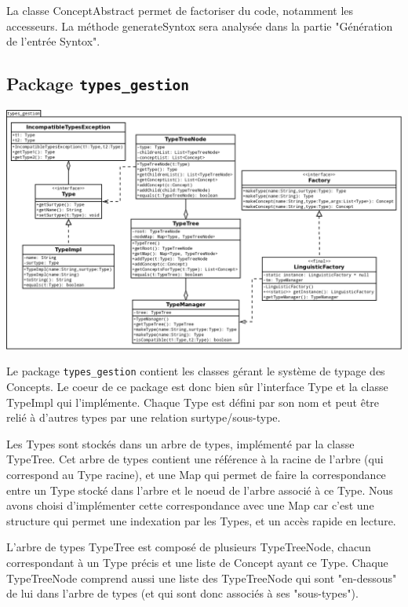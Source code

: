 \documentclass[12pt]{report}
\begin{document}
La classe ConceptAbstract permet de factoriser du code, notamment les accesseurs.
La méthode generateSyntox sera analysée dans la partie "Génération de l'entrée Syntox".

\subsection{Package \texttt{types\_gestion}}

\begin{center}
\includegraphics[scale=0.4]{DiagLinguistic_types_gestion.png}
\end{center}

Le package \texttt{types\_gestion} contient les classes gérant le système de typage des Concepts. Le coeur de ce package est donc bien sûr l'interface Type et la classe TypeImpl qui l'implémente.
Chaque Type est défini par son nom et peut être relié à d'autres types par une relation surtype/sous-type.

\bigskip

Les Types sont stockés dans un arbre de types, implémenté par la classe TypeTree. Cet arbre de types contient une référence à la racine de l'arbre (qui correspond au Type racine), et une Map qui permet de faire la correspondance entre un Type stocké dans l'arbre et le noeud de l'arbre associé à ce Type. Nous avons choisi d'implémenter cette correspondance avec une Map car c'est une structure qui permet une indexation par les Types, et un accès rapide en lecture.

L'arbre de types TypeTree est composé de plusieurs TypeTreeNode, chacun correspondant à un Type précis et une liste de Concept ayant ce Type. Chaque TypeTreeNode comprend aussi une liste des TypeTreeNode qui sont "en-dessous" de lui dans l'arbre de types (et qui sont donc associés à ses "sous-types").
\end{document}
